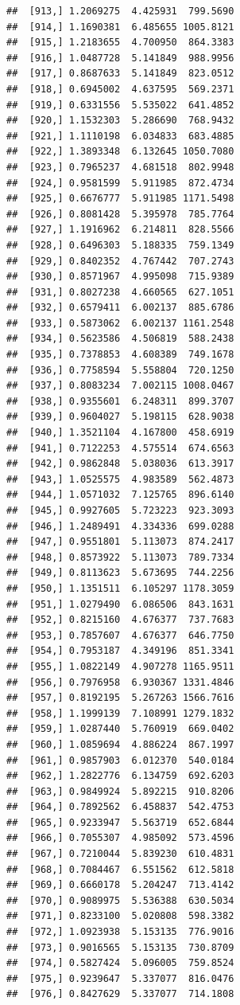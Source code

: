 \documentclass[article]{jss}\usepackage[]{graphicx}\usepackage[]{xcolor}
\makeatletter
\newenvironment{kframe}{%
 \def\at@end@of@kframe{}%
 \ifinner\ifhmode%
  \def\at@end@of@kframe{\end{minipage}}%
  \begin{minipage}{\columnwidth}%
 \fi\fi%
 \def\FrameCommand##1{\hskip\@totalleftmargin \hskip-\fboxsep
 \colorbox{shadecolor}{##1}\hskip-\fboxsep
     \hskip-\linewidth \hskip-\@totalleftmargin \hskip\columnwidth}%
 \MakeFramed {\advance\hsize-\width
   \@totalleftmargin\z@ \linewidth\hsize
   \@setminipage}}%
 {\par\unskip\endMakeFramed%
 \at@end@of@kframe}
\newenvironment{knitrout}{}{} %
\makeatother
\begin{document}
\begin{knitrout}
\begin{kframe}
\begin{verbatim}
##  [913,] 1.2069275  4.425931  799.5690
##  [914,] 1.1690381  6.485655 1005.8121
##  [915,] 1.2183655  4.700950  864.3383
##  [916,] 1.0487728  5.141849  988.9956
##  [917,] 0.8687633  5.141849  823.0512
##  [918,] 0.6945002  4.637595  569.2371
##  [919,] 0.6331556  5.535022  641.4852
##  [920,] 1.1532303  5.286690  768.9432
##  [921,] 1.1110198  6.034833  683.4885
##  [922,] 1.3893348  6.132645 1050.7080
##  [923,] 0.7965237  4.681518  802.9948
##  [924,] 0.9581599  5.911985  872.4734
##  [925,] 0.6676777  5.911985 1171.5498
##  [926,] 0.8081428  5.395978  785.7764
##  [927,] 1.1916962  6.214811  828.5566
##  [928,] 0.6496303  5.188335  759.1349
##  [929,] 0.8402352  4.767442  707.2743
##  [930,] 0.8571967  4.995098  715.9389
##  [931,] 0.8027238  4.660565  627.1051
##  [932,] 0.6579411  6.002137  885.6786
##  [933,] 0.5873062  6.002137 1161.2548
##  [934,] 0.5623586  4.506819  588.2438
##  [935,] 0.7378853  4.608389  749.1678
##  [936,] 0.7758594  5.558804  720.1250
##  [937,] 0.8083234  7.002115 1008.0467
##  [938,] 0.9355601  6.248311  899.3707
##  [939,] 0.9604027  5.198115  628.9038
##  [940,] 1.3521104  4.167800  458.6919
##  [941,] 0.7122253  4.575514  674.6563
##  [942,] 0.9862848  5.038036  613.3917
##  [943,] 1.0525575  4.983589  562.4873
##  [944,] 1.0571032  7.125765  896.6140
##  [945,] 0.9927605  5.723223  923.3093
##  [946,] 1.2489491  4.334336  699.0288
##  [947,] 0.9551801  5.113073  874.2417
##  [948,] 0.8573922  5.113073  789.7334
##  [949,] 0.8113623  5.673695  744.2256
##  [950,] 1.1351511  6.105297 1178.3059
##  [951,] 1.0279490  6.086506  843.1631
##  [952,] 0.8215160  4.676377  737.7683
##  [953,] 0.7857607  4.676377  646.7750
##  [954,] 0.7953187  4.349196  851.3341
##  [955,] 1.0822149  4.907278 1165.9511
##  [956,] 0.7976958  6.930367 1331.4846
##  [957,] 0.8192195  5.267263 1566.7616
##  [958,] 1.1999139  7.108991 1279.1832
##  [959,] 1.0287440  5.760919  669.0402
##  [960,] 1.0859694  4.886224  867.1997
##  [961,] 0.9857903  6.012370  540.0184
##  [962,] 1.2822776  6.134759  692.6203
##  [963,] 0.9849924  5.892215  910.8206
##  [964,] 0.7892562  6.458837  542.4753
##  [965,] 0.9233947  5.563719  652.6844
##  [966,] 0.7055307  4.985092  573.4596
##  [967,] 0.7210044  5.839230  610.4831
##  [968,] 0.7084467  6.551562  612.5818
##  [969,] 0.6660178  5.204247  713.4142
##  [970,] 0.9089975  5.536388  630.5034
##  [971,] 0.8233100  5.020808  598.3382
##  [972,] 1.0923938  5.153135  776.9016
##  [973,] 0.9016565  5.153135  730.8709
##  [974,] 0.5827424  5.096005  759.8524
##  [975,] 0.9239647  5.337077  816.0476
##  [976,] 0.8427629  5.337077  714.1808

\end{verbatim}
\end{kframe}
\end{knitrout}
\end{document}

